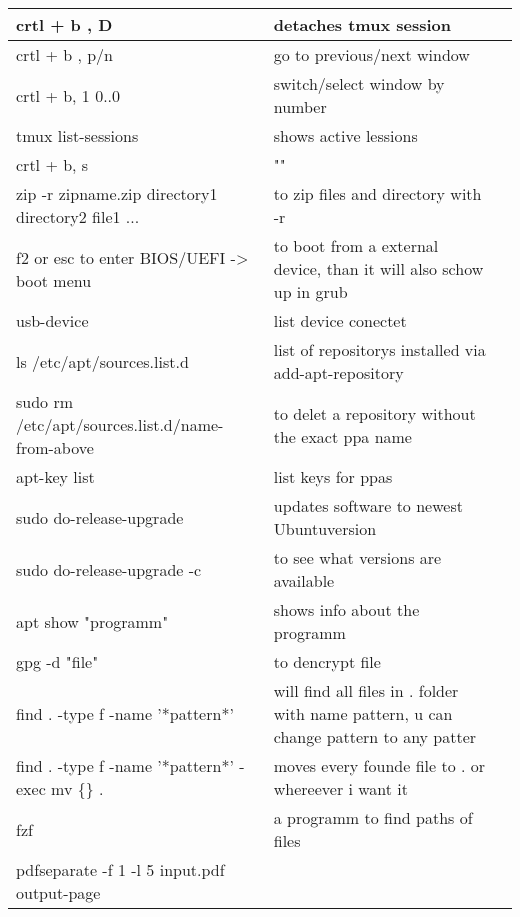 \documentclass[12pt]{article}
\begin{document}
\begin{tabular}{| p{6.5cm} | p{6.5cm} | p{6.5cm} |}
    \hline 
    crtl + b , D & detaches tmux session &\\
    \hline
    crtl + b , p/n & go to previous/next window & \\
    \hline
    crtl + b, 1 0..0 & switch/select window by number & \\
    \hline
    tmux list-sessions & shows active lessions & \\
    \hline
    crtl + b, s & "" & \\
    \hline
    zip -r zipname.zip directory1 directory2 file1 ... & to zip files and directory with -r & \\
    \hline
    f2 or esc to enter BIOS/UEFI -> boot menu & to boot from a external device, than it will also schow up in grub &\\
    \hline 
    usb-device & list device conectet &\\
    \hline
    ls /etc/apt/sources.list.d & list of repositorys installed via add-apt-repository & \\
    \hline
    sudo rm /etc/apt/sources.list.d/name- from-above & to delet a repository without the exact ppa name &\\
    \hline
    apt-key list & list keys for ppas &\\
    \hline
    sudo do-release-upgrade & updates software to newest Ubuntuversion &\\
    \hline 
    sudo do-release-upgrade -c & to see what versions are available &\\
    \hline
    apt show "programm" & shows info about the programm &\\
    \hline
    gpg -d "file" & to dencrypt file &\\
    \hline 
    find . -type f -name '*pattern*' & will find all files in . folder with name pattern, u can change pattern to any patter &\\
    \hline
    find . -type f -name '*pattern*' -exec mv \{\} . \; & moves every founde file to . or whereever i want it &\\
    \hline 
    fzf & a programm to find paths of files & \\
    \hline 
    pdfseparate -f 1 -l 5 input.pdf output-page%
\end{tabular}

\newpage
\end{document}
